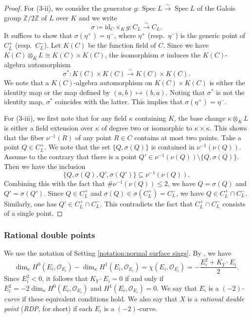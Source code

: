 \documentclass[12pt]{amsart}
\def\le{\leqslant}
\def\mapsto{\longmapsto}
\def\Spec{\operatorname{Spec}}
\def\id{\mathrm{id}}
\newcommand{\Z}{\mathbb{Z}}
\newcommand{\sO}{\mathcal{O}}
\theoremstyle{plain}
\theoremstyle{definition}
\theoremstyle{remark}
\newtheorem{defn and notation}[thm]{Definition and Notation}
\theoremstyle{plain}
\numberwithin{equation}{thm}
\begin{document}
\begin{proof}
    For (3-ii), we consider the generator $g \colon \Spec L \xrightarrow{\sim} \Spec L$ of the Galois group $\Z/2\Z$ of $L$ over $K$ and we write
    \[
    \sigma \coloneqq \id_C \times_K g : C_L \xrightarrow{\sim} C_L.
    \]
    It suffices to show that $\sigma(\eta^+)=\eta^-$, where $\eta^+$ (resp.~$\eta^-$) is the generic point of $C_L^+$ (resp.~$C_L^-$).
    Let $K(C)$ be the function field of $C$.
    Since we have $K(C) \otimes_K L \cong K(C) \times K(C)$, the isomorphism $\sigma$ induces the $K(C)$-algebra automorphism 
    \[
    \sigma^* : K(C) \times K(C) \xrightarrow{\sim} K(C) \times K(C).
    \]
    We note that a $K(C)$-algebra automorphism on $K(C) \times K(C)$ is either the identity map or the map defined by $(a,b) \mapsto (b,a)$.
    Noting that $\sigma^*$ is not the identity map, $\sigma^*$ coincides with the latter.
    This implies that $\sigma(\eta^+)=\eta^-$.
    
    For (3-iii), we first note that for any field $\kappa$ containing $K$, the base change $\kappa \otimes_K L$ is either a field extension over $\kappa$ of degree two or isomorphic to $\kappa \times \kappa$.
    This shows that the fiber $\nu^{-1}(R)$ of any point $R \in C$ contains at most two points.
    Take a point $Q \in C_L^+$.
    We note that the set $\{Q, \sigma(Q)\}$ is contained in $\nu^{-1}(\nu(Q))$.
    Assume to the contrary that there is a point $Q' \in \nu^{-1}(\nu(Q)) \setminus \{Q, \sigma(Q)\}$.
    Then we have the inclusion
    \[
    \{Q, \sigma(Q), Q', \sigma(Q')\} \subseteq \nu^{-1}(\nu(Q)).
    \]
    Combining this with the fact that $\# \nu^{-1}(\nu(Q)) \le 2$, we have $Q=\sigma(Q)$ and $Q' = \sigma(Q')$.
    Since $Q \in C_L^+$ and $\sigma(Q) \in \sigma(C_L^+)=C_L^-$, we have $Q \in C_L^+ \cap C_L^-$.
    Similarly, one has $Q' \in C_L^+ \cap C_L^-$.
    This contradicts the fact that $C_L^{+} \cap C_L^-$ consists of a single point.
    \end{proof}


\subsubsection{Rational double points}
We use the notation of Setting \ref{notation:normal surface sings}.
By \cite[Proposition 3.7]{Sato-Takagi(generalhyperplane)}, we have
\[
\dim_{\kappa} H^0(E_i, \sO_{E_i})-\dim_{\kappa} H^1(E_i, \sO_{E_i})=\chi(E_i, \sO_{E_i})=-\frac{E_i^2+K_Y\cdot E_i}{2}.
\]
Since $E_i^2<0$, it follows that $K_Y\cdot E_i=0$ if and only if $E_i^2=-2\dim_{\kappa} H^0(E_i, \sO_{E_i})$ and $H^1(E_i, \sO_{E_i})=0$.
We say that $E_i$ is a \textit{$(-2)$-curve} if these equivalent conditions hold.
We also say that $X$ is a \emph{rational double point} (\emph{RDP}, for short) if each $E_i$ is a $(-2)$-curve.
\end{document}
